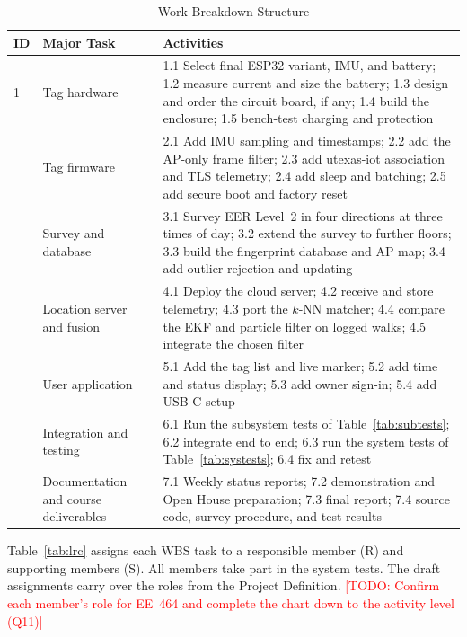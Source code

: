\documentclass[12pt,letterpaper]{article}
\newenvironment{spectable}{\setstretch{1.0}\renewcommand{\arraystretch}{1.1}}{}
\newcommand{\TODO}[1]{\textcolor{red}{[TODO: #1]}}
\begin{document}
\begin{table}[H]
\caption{Work Breakdown Structure}
\label{tab:wbs}
\centering
\begin{spectable}
\begin{tabularx}{\linewidth}{@{}L{0.45in} L{1.9in} Y@{}}
\toprule
\textbf{ID} & \textbf{Major Task} & \textbf{Activities} \\
 & Tag hardware & 1.1 Select final ESP32 variant, IMU, and battery; 1.2 measure current and size the battery; 1.3 design and order the circuit board, if any; 1.4 build the enclosure; 1.5 bench-test charging and protection \\  & Tag firmware & 2.1 Add IMU sampling and timestamps; 2.2 add the AP-only frame filter; 2.3 add utexas-iot association and TLS telemetry; 2.4 add sleep and batching; 2.5 add secure boot and factory reset \\  & Survey and database & 3.1 Survey EER Level~2 in four directions at three times of day; 3.2 extend the survey to further floors; 3.3 build the fingerprint database and AP map; 3.4 add outlier rejection and updating \\  & Location server and fusion & 4.1 Deploy the cloud server; 4.2 receive and store telemetry; 4.3 port the $k$-NN matcher; 4.4 compare the EKF and particle filter on logged walks; 4.5 integrate the chosen filter \\  & User application & 5.1 Add the tag list and live marker; 5.2 add time and status display; 5.3 add owner sign-in; 5.4 add USB-C setup \\  & Integration and testing & 6.1 Run the subsystem tests of Table~\ref{tab:subtests}; 6.2 integrate end to end; 6.3 run the system tests of Table~\ref{tab:systests}; 6.4 fix and retest \\  & Documentation and course deliverables & 7.1 Weekly status reports; 7.2 demonstration and Open House preparation; 7.3 final report; 7.4 source code, survey procedure, and test results \\
\bottomrule
\end{tabularx}
\end{spectable}
\end{table}

Table~\ref{tab:lrc} assigns each WBS task to a responsible member (R) and supporting members (S). All
members take part in the system tests. The draft assignments carry over the roles from the Project
Definition. \TODO{Confirm each member's role for EE~464 and complete the chart down to the activity
level (Q11)}
\end{document}
